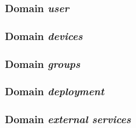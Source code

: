 \subsubsection{Domain \textit{user}}
\subsubsection{Domain \textit{devices}}
\subsubsection{Domain \textit{groups}}
\subsubsection{Domain \textit{deployment}}
\subsubsection{Domain \textit{external services}}